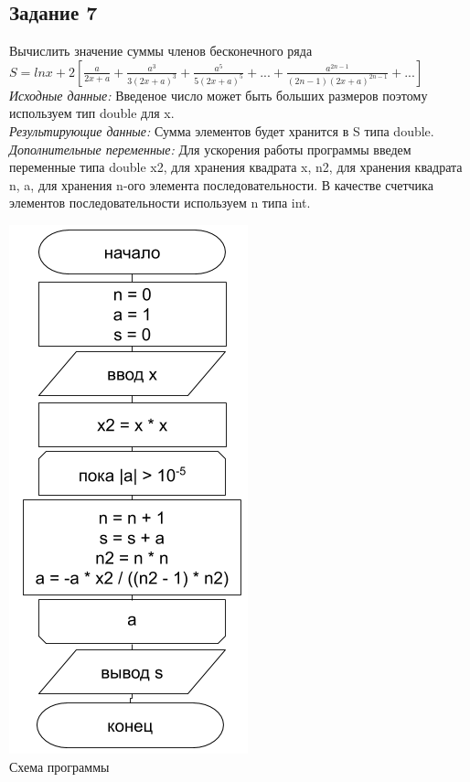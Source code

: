 \documentclass[a4paper,14pt]{extarticle}
\begin{document}
\subsection{Задание 7}
Вычислить значение суммы членов бесконечного ряда\\
$S = ln x + \displaystyle2[\frac {a} {2x+a} + \frac {a^3} {3(2x+a)^3} + \frac {a^5} {5(2x+a)^5}
+ ... + \frac {a^{2n-1}} {(2n-1)(2x+a)^{2n-1}} + ...]$\\
\textit{Исходные данные:} Введеное число может быть больших размеров поэтому используем тип double для x.\\
\textit{Результирующие данные:} Сумма элементов будет хранится в S типа double.\\
\textit{Дополнительные переменные:} Для ускорения работы программы введем переменные типа double x2, для хранения квадрата x, n2, для хранения квадрата n, a, для хранения n-ого элемента последовательности. В качестве счетчика элементов последовательности используем n типа int.\\
\begin{center}
\includegraphics[scale=0.6]{lab2-7.png}\\
Схема программы
\end{center}
\end{document}
